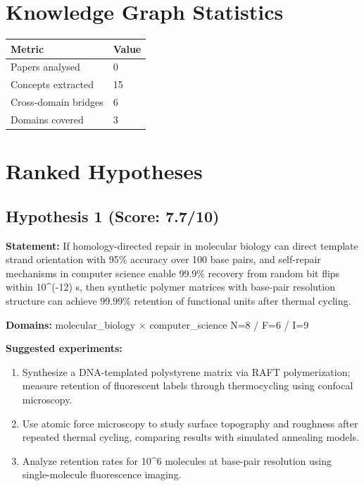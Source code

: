 \documentclass[12pt,a4paper]{article}
\begin{document}
\section{Knowledge Graph Statistics}

\begin{tabular}{ll}
\toprule
Metric & Value \\
\midrule
Papers analysed   & 0 \\
Concepts extracted & 15 \\
Cross-domain bridges & 6 \\
Domains covered   & 3 \\
\bottomrule
\end{tabular}

\section{Ranked Hypotheses}

\subsection*{Hypothesis 1 (Score: 7.7/10)}

\textbf{Statement:} If homology-directed repair in molecular biology can direct template strand orientation with 95\% accuracy over 100 base pairs, and self-repair mechanisms in computer science enable 99.9\% recovery from random bit flips within 10\textasciicircum{}(-12) s, then synthetic polymer matrices with base-pair resolution structure can achieve 99.99\% retention of functional units after thermal cycling.

\noindent\textbf{Domains:} molecular\_biology $\times$ computer\_science
\hspace{1em} N=8 / F=6 / I=9

\textbf{Suggested experiments:}
\begin{enumerate}
  \item Synthesize a DNA-templated polystyrene matrix via RAFT polymerization; measure retention of fluorescent labels through thermocycling using confocal microscopy.
  \item Use atomic force microscopy to study surface topography and roughness after repeated thermal cycling, comparing results with simulated annealing models.
  \item Analyze retention rates for 10\textasciicircum{}6 molecules at base-pair resolution using single-molecule fluorescence imaging.
\end{enumerate}
\end{document}
